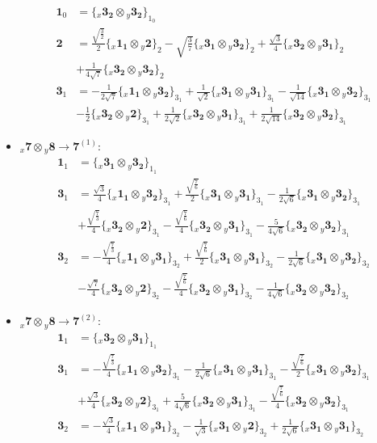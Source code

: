 \documentclass[english]{article}
\newcommand{\rep}[1]{\mathbf{#1}}
\newcommand{\repx}[2]{{}_{#2}\mathbf{#1}}
\newcommand{\subcg}[3]{\big\{ \repx{#1}{x}\otimes\repx{#2}{y}\big\}^{}_{#3}}
\begin{document}
\begin{itemize}
\begin{align*}
\rep{1}_{0} & = \subcg{3_{2}}{3_{2}}{1_{0}}
\\
\rep{2} & = \frac{\sqrt{\frac{3}{2}}}{2}\subcg{1_{1}}{2}{2}-\sqrt{\frac{3}{7}}\subcg{3_{1}}{3_{2}}{2}+\frac{\sqrt{3}}{4}\subcg{3_{2}}{3_{1}}{2} \\ 
 & +\frac{1}{4 \sqrt{7}}\subcg{3_{2}}{3_{2}}{2}
\\
\rep{3}_{1} & = -\frac{1}{2 \sqrt{7}}\subcg{1_{1}}{3_{2}}{3_{1}}+\frac{1}{\sqrt{2}}\subcg{3_{1}}{3_{1}}{3_{1}}-\frac{1}{\sqrt{14}}\subcg{3_{1}}{3_{2}}{3_{1}} \\ 
 & -\frac{1}{2}\subcg{3_{2}}{2}{3_{1}}+\frac{1}{2 \sqrt{2}}\subcg{3_{2}}{3_{1}}{3_{1}}+\frac{1}{2 \sqrt{14}}\subcg{3_{2}}{3_{2}}{3_{1}}
\end{align*}
\item $\repx{7}{x}\otimes\repx{8}{y}\to\rep{7}^{(1)}$:
\begin{align*}
\rep{1}_{1} & = \subcg{3_{1}}{3_{2}}{1_{1}}
\\
\rep{3}_{1} & = \frac{\sqrt{3}}{4}\subcg{1_{1}}{3_{2}}{3_{1}}+\frac{\sqrt{\frac{7}{6}}}{2}\subcg{3_{1}}{3_{1}}{3_{1}}-\frac{1}{2 \sqrt{6}}\subcg{3_{1}}{3_{2}}{3_{1}} \\ 
 & +\frac{\sqrt{\frac{7}{3}}}{4}\subcg{3_{2}}{2}{3_{1}}-\frac{\sqrt{\frac{7}{6}}}{4}\subcg{3_{2}}{3_{1}}{3_{1}}-\frac{5}{4 \sqrt{6}}\subcg{3_{2}}{3_{2}}{3_{1}}
\\
\rep{3}_{2} & = -\frac{\sqrt{\frac{7}{3}}}{4}\subcg{1_{1}}{3_{1}}{3_{2}}+\frac{\sqrt{\frac{7}{6}}}{2}\subcg{3_{1}}{3_{1}}{3_{2}}-\frac{1}{2 \sqrt{6}}\subcg{3_{1}}{3_{2}}{3_{2}} \\ 
 & -\frac{\sqrt{7}}{4}\subcg{3_{2}}{2}{3_{2}}-\frac{\sqrt{\frac{7}{6}}}{4}\subcg{3_{2}}{3_{1}}{3_{2}}-\frac{1}{4 \sqrt{6}}\subcg{3_{2}}{3_{2}}{3_{2}}
\end{align*}
\item $\repx{7}{x}\otimes\repx{8}{y}\to\rep{7}^{(2)}$:
\begin{align*}
\rep{1}_{1} & = \subcg{3_{2}}{3_{1}}{1_{1}}
\\
\rep{3}_{1} & = -\frac{\sqrt{\frac{7}{3}}}{4}\subcg{1_{1}}{3_{2}}{3_{1}}-\frac{1}{2 \sqrt{6}}\subcg{3_{1}}{3_{1}}{3_{1}}-\frac{\sqrt{\frac{7}{6}}}{2}\subcg{3_{1}}{3_{2}}{3_{1}} \\ 
 & +\frac{\sqrt{3}}{4}\subcg{3_{2}}{2}{3_{1}}+\frac{5}{4 \sqrt{6}}\subcg{3_{2}}{3_{1}}{3_{1}}-\frac{\sqrt{\frac{7}{6}}}{4}\subcg{3_{2}}{3_{2}}{3_{1}}
\\
\rep{3}_{2} & = -\frac{\sqrt{3}}{4}\subcg{1_{1}}{3_{1}}{3_{2}}-\frac{1}{\sqrt{3}}\subcg{3_{1}}{2}{3_{2}}+\frac{1}{2 \sqrt{6}}\subcg{3_{1}}{3_{1}}{3_{2}} \\ 

\end{align*}
\end{itemize}
\end{document}
